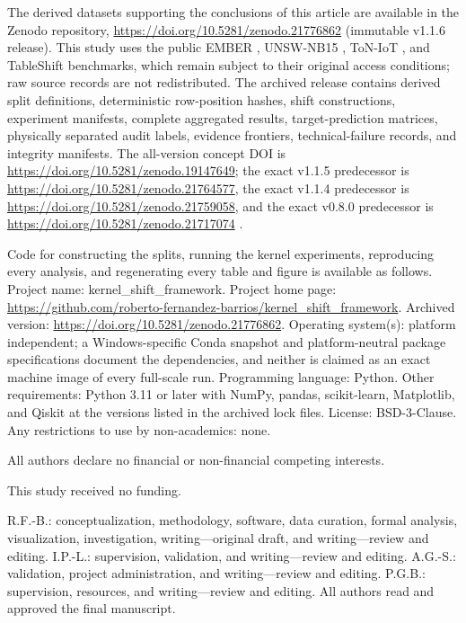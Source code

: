 \documentclass[referee,lineno,pdflatex,sn-vancouver-num]{sn-jnl}
\theoremstyle{thmstyleone}%
\theoremstyle{thmstyletwo}%
\theoremstyle{thmstylethree}%
\begin{document}
The derived datasets supporting the conclusions of this article are available in the Zenodo repository, \url{https://doi.org/10.5281/zenodo.21776862} (immutable v1.1.6 release). This study uses the public EMBER \cite{anderson2018ember}, UNSW-NB15 \cite{moustafa2015unsw}, ToN-IoT \cite{alsaedi2020toniot}, and TableShift \cite{gardner2023tableshift} benchmarks, which remain subject to their original access conditions; raw source records are not redistributed. The archived release contains derived split definitions, deterministic row-position hashes, shift constructions, experiment manifests, complete aggregated results, target-prediction matrices, physically separated audit labels, evidence frontiers, technical-failure records, and integrity manifests. The all-version concept DOI is \url{https://doi.org/10.5281/zenodo.19147649}; the exact v1.1.5 predecessor is \url{https://doi.org/10.5281/zenodo.21764577}, the exact v1.1.4 predecessor is \url{https://doi.org/10.5281/zenodo.21759058}, and the exact v0.8.0 predecessor is \url{https://doi.org/10.5281/zenodo.21717074} \cite{fernandezbarrios2026artifactv08}.

Code for constructing the splits, running the kernel experiments, reproducing every analysis, and regenerating every table and figure is available as follows. Project name: kernel\_shift\_framework. Project home page: \url{https://github.com/roberto-fernandez-barrios/kernel_shift_framework}. Archived version: \url{https://doi.org/10.5281/zenodo.21776862}. Operating system(s): platform independent; a Windows-specific Conda snapshot and platform-neutral package specifications document the dependencies, and neither is claimed as an exact machine image of every full-scale run. Programming language: Python. Other requirements: Python 3.11 or later with NumPy, pandas, scikit-learn, Matplotlib, and Qiskit at the versions listed in the archived lock files. License: BSD-3-Clause. Any restrictions to use by non-academics: none.

All authors declare no financial or non-financial competing interests.

This study received no funding.

R.F.-B.: conceptualization, methodology, software, data curation, formal analysis, visualization, investigation, writing---original draft, and writing---review and editing. I.P.-L.: supervision, validation, and writing---review and editing. A.G.-S.: validation, project administration, and writing---review and editing. P.G.B.: supervision, resources, and writing---review and editing. All authors read and approved the final manuscript.
\end{document}
